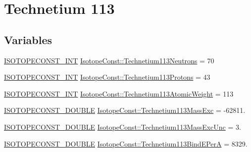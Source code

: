 \hypertarget{group___isotope_const-_technetium-_tc113}{}\section{Technetium 113}
\label{group___isotope_const-_technetium-_tc113}
\subsection*{Variables}
\begin{DoxyCompactItemize}
\item 
\mbox{\hyperlink{group___isotope_const-_macros_ga5f18360b3e99483a35c32d789e62621c}{I\+S\+O\+T\+O\+P\+E\+C\+O\+N\+S\+T\+\_\+\+I\+NT}} \mbox{\hyperlink{group___isotope_const-_technetium-_tc113_gae30b41b0dbb9a0b455908510dc2c15b6}{Isotope\+Const\+::\+Technetium113\+Neutrons}} = 70
\item 
\mbox{\hyperlink{group___isotope_const-_macros_ga5f18360b3e99483a35c32d789e62621c}{I\+S\+O\+T\+O\+P\+E\+C\+O\+N\+S\+T\+\_\+\+I\+NT}} \mbox{\hyperlink{group___isotope_const-_technetium-_tc113_gaedbff31519fd2421a9eab06b942ffd2f}{Isotope\+Const\+::\+Technetium113\+Protons}} = 43
\item 
\mbox{\hyperlink{group___isotope_const-_macros_ga5f18360b3e99483a35c32d789e62621c}{I\+S\+O\+T\+O\+P\+E\+C\+O\+N\+S\+T\+\_\+\+I\+NT}} \mbox{\hyperlink{group___isotope_const-_technetium-_tc113_ga31d7cc037b22c854d5db130d2cef5a71}{Isotope\+Const\+::\+Technetium113\+Atomic\+Weight}} = 113
\item 
\mbox{\hyperlink{group___isotope_const-_macros_ga8f45a7272ce02c0b4c65c44636ed719a}{I\+S\+O\+T\+O\+P\+E\+C\+O\+N\+S\+T\+\_\+\+D\+O\+U\+B\+LE}} \mbox{\hyperlink{group___isotope_const-_technetium-_tc113_ga928b09e4beee38486b15a4eaa99386b4}{Isotope\+Const\+::\+Technetium113\+Mass\+Exc}} = -\/62811.
\item 
\mbox{\hyperlink{group___isotope_const-_macros_ga8f45a7272ce02c0b4c65c44636ed719a}{I\+S\+O\+T\+O\+P\+E\+C\+O\+N\+S\+T\+\_\+\+D\+O\+U\+B\+LE}} \mbox{\hyperlink{group___isotope_const-_technetium-_tc113_gade511b58bae7b3a7b4ebfd560a13b4e9}{Isotope\+Const\+::\+Technetium113\+Mass\+Exc\+Unc}} = 3.
\item 
\mbox{\hyperlink{group___isotope_const-_macros_ga8f45a7272ce02c0b4c65c44636ed719a}{I\+S\+O\+T\+O\+P\+E\+C\+O\+N\+S\+T\+\_\+\+D\+O\+U\+B\+LE}} \mbox{\hyperlink{group___isotope_const-_technetium-_tc113_ga2476db9aa951088ccbc2cc86fdbce0d8}{Isotope\+Const\+::\+Technetium113\+Bind\+E\+PerA}} = 8329.

\end{DoxyCompactItemize}
